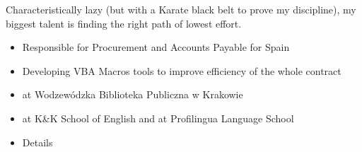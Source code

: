 \documentclass[10pt,a4paper]{../altacv}
\begin{document}

\begin{fullwidth}
\makecvheader
\end{fullwidth}

Characteristically lazy (but with a Karate black belt to prove my discipline), my biggest talent is finding the right path of lowest effort.
\medskip



\begin{itemize}
\item Responsible for Procurement and Accounts Payable for Spain
\item Developing VBA Macros tools to improve efficiency of the whole contract
\end{itemize}

\divider

\begin{itemize}
\item at Wodzewódzka Biblioteka Publiczna w Krakowie
\item at K\&K School of English and at Profilingua Language School
\end{itemize}


\begin{itemize}
\item Details
\end{itemize}
\end{document}
